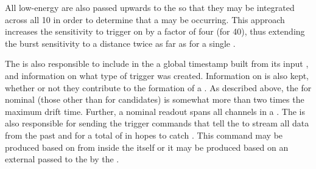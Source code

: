 All low-energy  are also passed upwards to the
 so that they may be integrated across all \SI{10}{\kton}
 in order to determine that a  may be
occurring. 
This approach increases the sensitivity to trigger on  by
a factor of four (for \SI{40}{\kton}), thus extending the burst
sensitivity to a distance twice as far as for a single \nominalmodsize
{}. 

	
The  is also responsible to include in the
 a global timestamp built from its input
, and information on what type of trigger was
created. 
Information on  is also kept, whether or not
they contribute to the formation of a . 
As described above, the  for nominal
 (those other than for  candidates)
is somewhat more than two times the maximum drift time. 
Further, a nominal readout spans all channels in a . 
The  is also responsible for sending the trigger commands
that tell the  to stream all data from the past
\snbpretime and for a total of \snbtime in hopes to catch
.
This command may be produced based on  from
inside the  itself or it may be produced based on an external
  passed to the  by the
.
